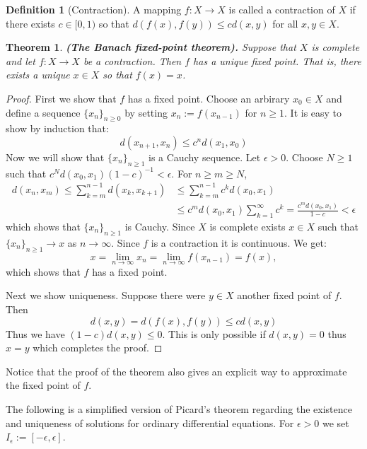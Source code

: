 \documentclass[11pt,a4paper]{article}
\theoremstyle{definition}
\newtheorem{definition}{Definition}[section]
\theoremstyle{plain}
\newtheorem{theorem}{Theorem}[section]
\renewcommand{\tt}[1]{\textnormal{\textbf{(#1).}}} %
\begin{document}
  \begin{definition}[Contraction]
    A mapping $f \colon X \to X$ is called a contraction of $X$ if there 
    exists $c \in [0, 1)$ so that $d(f(x),f(y)) \le cd(x,y)$ for all 
    $x,y \in X$.
  \end{definition}

  \begin{theorem}
    \tt{The Banach fixed-point theorem}
    Suppose that $X$ is complete
    and let $f \colon X \to X$ be a contraction. Then $f$ has a unique fixed 
    point. That is, there exists a unique $x \in X$ so that $f(x) = x$.
  \end{theorem}
  \begin{proof}
    First we show that $f$ has a fixed point. Choose an arbirary $x_0 \in X$
    and define a sequence $\{x_n\}_{n \geq 0}$ by setting
    $x_n := f(x_{n-1})$ for $n \geq 1$. It is easy to show by induction
    that:
    \[
      d(x_{n+1},x_{n}) \le c^n d(x_1,x_0)
    \]
    Now we will show that $\{x_n\}_{n \geq 1}$ is a Cauchy sequence.
    Let $\epsilon > 0$. Choose $N \geq 1$ such that
    $c^N d(x_0,x_1) (1-c)^{-1} < \epsilon$. For $n \geq m \geq N$,
    \begin{align*}
      d(x_n,x_m) \le 
      \sum_{k=m}^{n-1}{d(x_{k},x_{k+1})} &\le 
      \sum_{k=m}^{n-1}{c^k d(x_{0},x_{1})} \\ &\le
      c^m d(x_0,x_1) \sum_{k=1}^{\infty}{c^k} =
      \frac{c^m d(x_0,x_1)}{1-c} < \epsilon
    \end{align*}
    which shows that $\{x_n\}_{n \geq 1}$ is Cauchy. Since $X$ is complete
    exists $x \in X$ such that $\{x_n\}_{n \geq 1} \to x$ as $n \to \infty$.
    Since $f$ is a contraction it is continuous. We get:
    \[
      x = \lim_{n\to\infty}{x_n} = \lim_{n \to \infty}{f(x_{n-1})} = f(x),
    \]
    which shows that $f$ has a fixed point.
    
    Next we show uniqueness. Suppose there were $y \in X$ another fixed
    point of $f$. Then
    \[
      d(x,y) = d(f(x),f(y)) \le cd(x,y)
    \]
    Thus we have $(1-c)d(x,y) \le 0$. This is only possible if $d(x,y)=0$
    thus $x=y$ which completes the proof.
  \end{proof}

  Notice that the proof of the theorem also gives an explicit way to 
  approximate the fixed point of $f$.

  The following is a simplified version of Picard's theorem regarding the 
  existence and uniqueness of solutions for ordinary differential equations. 	
  For $\epsilon > 0$ we set $I_\epsilon := [-\epsilon, \epsilon]$.
\end{document}
